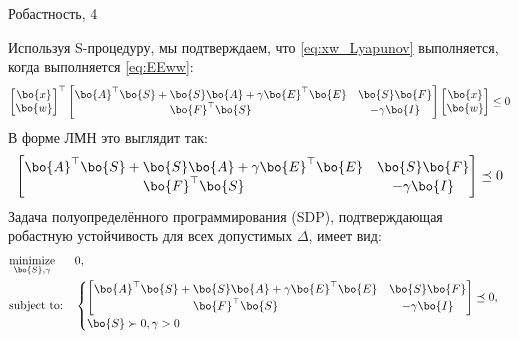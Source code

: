 \documentclass{beamer}
\begin{document}
\begin{frame}{Робастность, 4}
	\begin{flushleft}
		
		
		Используя S-процедуру, мы подтверждаем, что \eqref{eq:xw_Lyapunov} выполняется, когда выполняется \eqref{eq:EEww}:
		\begin{equation}
			\begin{bmatrix}
				\bo{x} \\ \bo{w}
			\end{bmatrix}^\top
			\begin{bmatrix}
				\bo{A}^\top \bo{S} + \bo{S}\bo{A} + \gamma \bo{E}^\top \bo{E} & \bo{S}\bo{F} \\
				\bo{F}^\top\bo{S} & -\gamma\bo{I}
			\end{bmatrix}		
			\begin{bmatrix}
				\bo{x} \\ \bo{w}
			\end{bmatrix}
			\leq 0
		\end{equation}
		В форме ЛМН это выглядит так:
		\begin{equation}
			\begin{bmatrix}
				\bo{A}^\top \bo{S} + \bo{S}\bo{A} + \gamma \bo{E}^\top \bo{E} & \bo{S}\bo{F} \\
				\bo{F}^\top\bo{S} & -\gamma\bo{I}
			\end{bmatrix}		
			\preceq 0
		\end{equation}	
		Задача полуопределённого программирования (SDP), подтверждающая робастную устойчивость для всех допустимых $\Delta$, имеет вид:
		\begin{equation}
			\label{robust_stability_sdp}
			\begin{aligned}
				& \underset{\bo{S}, \gamma}{\text{minimize}} 
				& &  0, \\
				& \text{subject to:} & & 
				\begin{cases}
					\begin{bmatrix}
						\bo{A}^\top \bo{S} + \bo{S}\bo{A} + \gamma \bo{E}^\top \bo{E} & \bo{S}\bo{F} \\
						\bo{F}^\top\bo{S} & -\gamma\bo{I}
					\end{bmatrix}\preceq 0, \\ 
					\bo{S} \succ 0, 
					\gamma > 0
				\end{cases}
			\end{aligned}
		\end{equation}
		
		
	\end{flushleft}
\end{frame}
\end{document}
